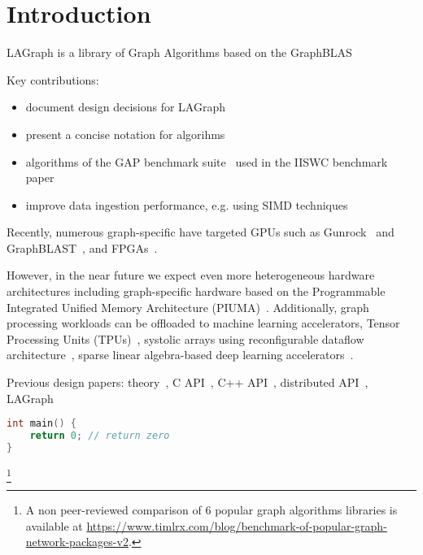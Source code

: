\section{Introduction}
\label{sec:introduction}

LAGraph is a library of Graph Algorithms based on the GraphBLAS

Key contributions:

\begin{itemize}
    \item document design decisions for LAGraph
    \item present a concise notation for \grb algorihms
    \item algorithms of the GAP benchmark suite~\cite{DBLP:journals/corr/BeamerAP15} used in the IISWC benchmark paper~\cite{DBLP:conf/iiswc/AzadABBCDDDDFGG20}
    \item improve data ingestion performance, e.g. using SIMD techniques~\cite{DBLP:journals/vldb/LangdaleL19}
\end{itemize}

Recently, numerous graph-specific have targeted GPUs such as Gunrock~\cite{DBLP:journals/topc/WangPDWYWOYLRO17} and \mbox{GraphBLAST}~\cite{DBLP:journals/corr/abs-1908-01407}, and FPGAs~\cite{DBLP:journals/corr/abs-1903-06697}.

However, in the near future we expect even more heterogeneous hardware architectures including graph-specific hardware based on the Programmable Integrated Unified Memory Architecture (PIUMA)~\cite{DBLP:journals/corr/abs-2010-06277}.
Additionally, graph processing workloads can be offloaded to  machine learning accelerators, \eg
Tensor Processing Units (TPUs)~\cite{DBLP:conf/isca/JouppiYPPABBBBB17},
systolic arrays using reconfigurable dataflow architecture~\cite{SambaNova},
sparse linear algebra-based deep learning accelerators~\cite{Cerebras}.

Previous \grb design papers:
theory~\cite{DBLP:conf/hpec/MattsonBBBDFFGGHKLLPPRSWY13},
C API~\cite{DBLP:conf/hpec/MattsonYMBM17},
C++ API~\cite{DBLP:conf/ipps/BrockBMMM20},
distributed API~\cite{DBLP:conf/ipps/BrockBMMMPSS20},
LAGraph~\cite{DBLP:conf/ipps/MattsonDKBMMY19}

\begin{lstlisting}[language=C, label=lst:example, caption=Example]
int main() {
    return 0; // return zero
}
\end{lstlisting}



\footnote{A non peer-reviewed comparison of 6 popular graph algorithms libraries is available at
\url{https://www.timlrx.com/blog/benchmark-of-popular-graph-network-packages-v2}.}
